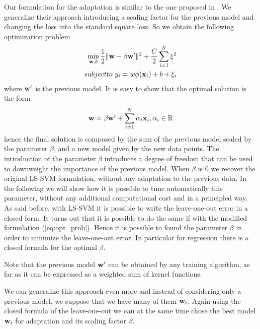 Our formulation for the adaptation is similar to the one proposed in
\cite{YangYH07}.
We generalize their approach introducing a scaling factor for the previous
model and changing the loss into the standard square loss.
So we obtain the following optimization problem
\begin{align}
\min_{\ww,b} \frac{1}{2} \|\ww- \beta \ww'\|^2 + \frac{C}{2} \sum_{i=1}^N \xi^2 \\
subject to \ y_i = w \phi(\xx_i) + b + \xi_i
\label{eq:opt_prob}
\end{align}
\noindent where $\mathbf{w}'$ is the previous model.
It is easy to show that the optimal solution is the form
\begin{equation}
\mathbf{w} = \beta \mathbf{w}' + \sum_{i=1}^N \alpha_i \mathbf{x}_i, \alpha_i \in \mathbb{R}
\end{equation}
\noindent hence the final solution is composed by the sum of the previous model
scaled by the parameter $\beta$, and a new model given by the new data points.
The introduction of the parameter $\beta$ introduces a degree of freedom that
can be used to downweight the importance of the previous model. When $\beta$
is $0$ we recover the original LS-SVM formulation, without any adaptation to
the previous data.
In the following we will show how it is possible to tune automatically this
parameter, without any additional computational cost and in a principled way.
As said before, with LS-SVM it is possible to write the leave-one-out error
in a closed form. It turns out that it is possible to do the same if with the
modified formulation (\ref{eq:opt_prob}). Hence it is possible to found the
parameter $\beta$ in order to minimize the leave-one-out error. In particular
for regression there is a closed formula for the optimal $\beta$.

Note that the previous model $\mathbf{w}'$ can be obtained by any training algorithm,
as far as it can be expressed as a weighted sum of kernel functions.

We can generalize this approach even more and instead of considering only a
previous model, we suppose that we have many of them $\mathbf{w}_i$. Again using the
closed formula of the leave-one-out we can at the same time chose the best
model $\mathbf{w}_i$ for adaptation and its scaling factor $\beta$.